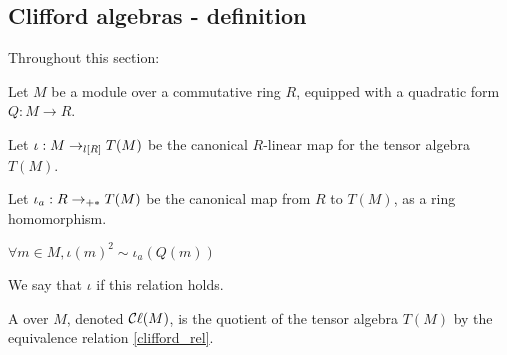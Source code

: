 \subsection{Clifford algebras - definition}
\label{sec:def}







Throughout this section:

Let $M$ be a module over a commutative ring $R$, equipped with a quadratic form $Q: M \to R$.

Let $\iota : M \lmap{R} T(M)$ be the canonical $R$-linear map for the tensor algebra $T(M)$.

Let $\iota_a : R \amap{R} T(M)$ be the canonical map from $R$ to $T(M)$, as a ring homomorphism.

\begin{definition}
  \label{clifford_rel}
  \leanok

  $\forall m \in M, \iota(m)^2 \sim \iota_a(Q(m))$
\end{definition}

We say that $\iota$  if this relation holds.

\begin{definition}
    \label{clifford_algebra}
    \leanok

    A  over $M$, denoted $\Cl (M)$, is
    the quotient of the tensor algebra $T(M)$
    by the equivalence relation \ref{clifford_rel}.
\end{definition}

